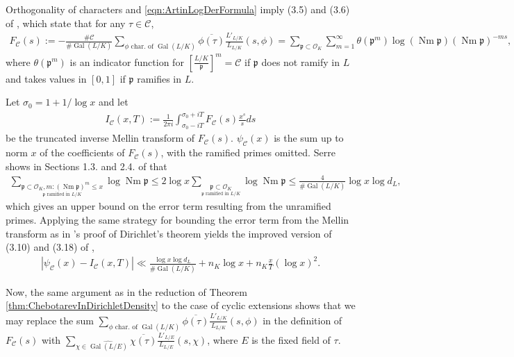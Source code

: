 \documentclass[12pt]{amsart}
\theoremstyle{definition}
\theoremstyle{remark}
\numberwithin{equation}{section}
\newcommand{\cC}{\mathcal C}
\newcommand{\cO}{\mathcal O}
\newcommand{\fkp}{\mathfrak p}
\DeclareMathOperator{\norm}{Nm}
\newcommand{\artin}[2]{\left[ \frac{#1}{#2}\right]}
\DeclareMathOperator{\Gal}{Gal}
\begin{document}
Orthogonality of characters and \eqref{eqn:ArtinLogDerFormula} imply (3.5) and (3.6) of \cite{LagariasOdlyzko77}, which state that for any $\tau \in \cC$,
\begin{align}
F_{\cC}(s) := -\frac{\# \cC}{\# \Gal(L/K)} \sum_{\phi \text{ char. of } \Gal(L/K)} \overline{\phi(\tau)} \frac{L'_{L/K}}{L_{L/K}}(s, \phi) 
= \sum_{\fkp \subset \cO_{K}} \sum_{m=1}^{\infty}\theta(\fkp^{m})\log(\norm \fkp)(\norm \fkp)^{-ms},
\end{align}
where $\theta(\fkp^{m})$ is an indicator function for $\artin{L/K}{\fkp}^{m} = \cC$ if $\fkp$ does not ramify in $L$ and takes values in $[0,1]$ if $\fkp$ ramifies in $L$.

Let $\sigma_{0} = 1 + 1/\log x$ and let
\begin{align}
I_{\cC}(x,T) := \frac{1}{2\pi i} \int_{\sigma_{0} - iT}^{\sigma_0 + iT} F_{\cC}(s) \frac{x^{s}}{s} ds
\end{align}
be the truncated inverse Mellin transform of $F_{\cC}(s)$.  $\psi_{\cC}(x)$ is the sum up to norm $x$ of the coefficients of $F_{\cC}(s)$, with the ramified primes omitted. Serre shows in Sections 1.3. and 2.4. of \cite{Serre81} that
\begin{align}
\sum_{\underset{\fkp \text{ ramified in } L/K}{\fkp \subset \cO_{K}, m: (\norm \fkp)^{m} \leq x}} \log \norm \fkp \leq 2 \log x \sum_{\underset{\fkp \text{ ramified in } L/K}{\fkp \subset \cO_{K}}} \log \norm \fkp \leq \frac{4}{\#\Gal(L/K)} \log x \log d_{L},
\end{align}
which gives an upper bound on the error term resulting from the unramified primes. 
Applying the same strategy for bounding the error term from the Mellin transform as in \cite{Davenport00}'s proof of Dirichlet's theorem yields the improved version of (3.10) and (3.18) of \cite{LagariasOdlyzko77}, 
\begin{align}
\left|\psi_{\cC}(x) - I_{\cC}(x,T)\right| \ll \frac{\log x \log d_{L}}{\# \Gal(L/K)} + n_{K} \log x + n_{K} \frac{x}{T} (\log x)^2.
\end{align}

Now, the same argument as in the reduction of Theorem \ref{thm:ChebotarevInDirichletDensity} to the case of cyclic extensions shows that we may replace the sum $\sum_{\phi \text{ char. of } \Gal(L/K)} \overline{\phi(\tau)} \frac{L'_{L/K}}{L_{L/K}}(s,\phi)$ in the definition of $F_{\cC}(s)$ with $\sum_{\chi \in \widehat{\Gal(L/E)}} \overline{\chi(\tau)} \frac{L'_{L/E}}{L_{L/E}}(s,\chi)$, where $E$ is the fixed field of $\tau$. 
\end{document}
